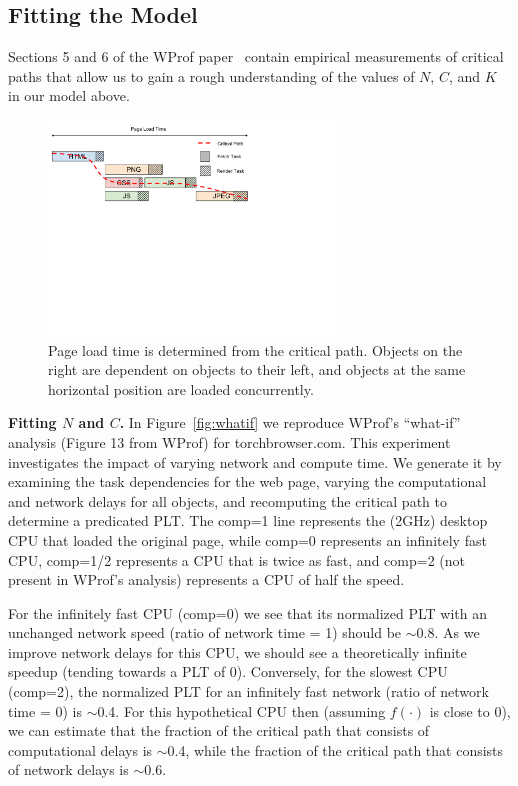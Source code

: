 \subsection{Fitting the Model}
\label{subsec:model_fitting}

Sections 5 and 6 of the WProf paper~\cite{wang2013demystifying} contain
empirical measurements of critical paths that allow us to gain a rough
understanding of the values of $N$, $C$, and $K$ in our model
above.
\begin{figure}[t]
    \hspace{-10pt}
    \includegraphics[width=3in]{../images/plt-diagram.pdf}
    \caption[]{\label{fig:plt-diagram} Page load time is determined from the critical path. Objects on the right are dependent on objects to their left, and objects at the same horizontal position are loaded concurrently.}
\end{figure}
{\bf Fitting $N$ and $C$.} In Figure~\ref{fig:whatif} we reproduce WProf's
``what-if'' analysis (Figure 13 from WProf)
for torchbrowser.com. This experiment investigates the impact of varying network
and compute time. We generate it by examining the task dependencies for the
web page, varying the computational and network delays for all
objects, and recomputing the critical path to determine a predicated PLT. The
comp=1 line represents the (2GHz) desktop CPU that loaded the original page, while comp=0
represents an infinitely fast CPU, comp=1/2 represents a CPU that is twice as fast, and
comp=2 (not present in WProf's analysis) represents a CPU
of half the speed.

For the infinitely fast CPU (comp=0) we see that its normalized PLT with an unchanged
network speed (ratio of network time = 1) should be
{\footnotesize$\sim$}0.8. As we improve network delays for this CPU, we should
see a theoretically infinite speedup (tending towards a PLT of 0).
Conversely, for
the slowest CPU (comp=2), the normalized PLT for an infinitely fast network (ratio of
network time = 0) is {\footnotesize$\sim$}0.4. For this hypothetical CPU then (assuming $f(\cdot)$ is close
to 0), we can estimate that the fraction of the critical path that consists
of computational delays is {\footnotesize$\sim$}0.4, while the fraction of the
critical path that consists of network delays is {\footnotesize$\sim$}0.6.

